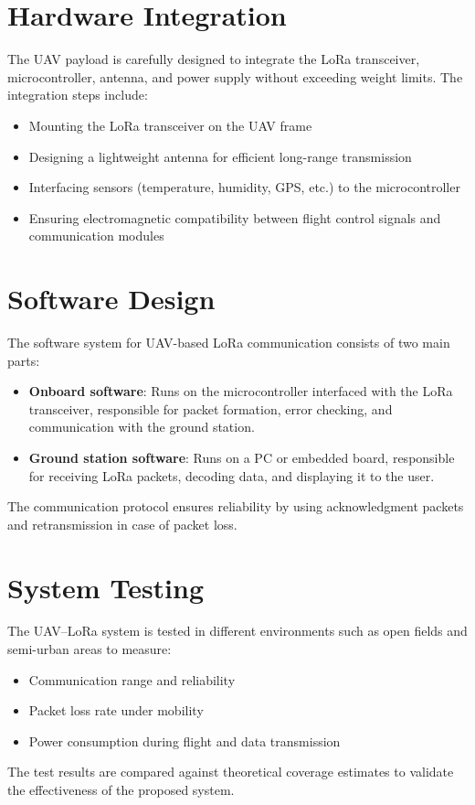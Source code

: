 \section{Hardware Integration}  
The UAV payload is carefully designed to integrate the LoRa transceiver, microcontroller, antenna, and power supply without exceeding weight limits. The integration steps include:  
\begin{itemize}
    \item Mounting the LoRa transceiver on the UAV frame  
    \item Designing a lightweight antenna for efficient long-range transmission  
    \item Interfacing sensors (temperature, humidity, GPS, etc.) to the microcontroller  
    \item Ensuring electromagnetic compatibility between flight control signals and communication modules  \cite{Mertens2020}
\end{itemize}  

\section{Software Design}  
The software system for UAV-based LoRa communication consists of two main parts:  
\begin{itemize}
    \item \textbf{Onboard software}: Runs on the microcontroller interfaced with the LoRa transceiver, responsible for packet formation, error checking, and communication with the ground station.  
    \item \textbf{Ground station software}: Runs on a PC or embedded board, responsible for receiving LoRa packets, decoding data, and displaying it to the user.  
\end{itemize}  
The communication protocol ensures reliability by using acknowledgment packets and retransmission in case of packet loss.  \cite{MOYSIADIS2021102388}

\section{System Testing}  
The UAV–LoRa system is tested in different environments such as open fields and semi-urban areas to measure:  
\begin{itemize}
    \item Communication range and reliability  
    \item Packet loss rate under mobility  
    \item Power consumption during flight and data transmission  
\end{itemize}  
The test results are compared against theoretical coverage estimates to validate the effectiveness of the proposed system.  
